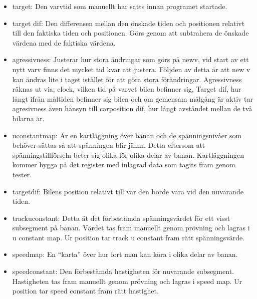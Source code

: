 \begin{itemize}
      \item target: Den varvtid som manuellt har satts innan programet startade.
      \item target dif: Den differensen mellan den önskade tiden och positionen relativt till den faktiska tiden och positionen. Görs genom att subtrahera de önskade värdena med de faktiska värdena.  
      \item agressivness: Justerar hur stora ändringar som görs på new\textunderscore v, vid start av ett nytt varv finns det mycket tid kvar att justera. Följden av detta är att new \textunderscore v kan ändras lite i taget istället för att göra stora förändringar. Agressivness räknas ut via; clock,  vilken tid på varvet bilen befinner sig, Target \textunderscore dif, hur långt ifrån måltiden befinner sig bilen och om gemensam målgång är aktiv tar agresivness även hänsyn till car\textunderscore position \textunderscore dif,  hur långt avståndet mellan de två bilarna är. 
      \item u\textunderscore constant\textunderscore map: Är en kartläggning över banan och de spänningsnivåer som behöver sättas så att spänningen blir jämn. Detta eftersom att spänningstillförseln beter sig olika för olika delar av banan. Kartläggningen kommer bygga på det register med inlagrad data som tagits fram genom tester.
      \item target\textunderscore dif: Bilens position relativt till var den borde vara vid den nuvarande tiden.
      \item track\textunderscore u\textunderscore constant: Detta ät det förbestämda spänningsvärdet för ett visst subsegment på banan. Värdet tas fram manuellt genom prövning och lagras i u \textunderscore constant \textunderscore map. Ur position tar track \textunderscore u \textunderscore constant fram rätt spänningsvärde. 
      \item speed\textunderscore map: En ``karta'' över hur fort man kan köra i olika delar av banan.
      \item speed\textunderscore constant: Den förbestämda hastigheten för nuvarande subsegment. Hastigheten tas fram manuellt genom prövning och lagras i speed \textunderscore map. Ur position tar speed \textunderscore constant fram rätt hastighet. 


\end{itemize}
